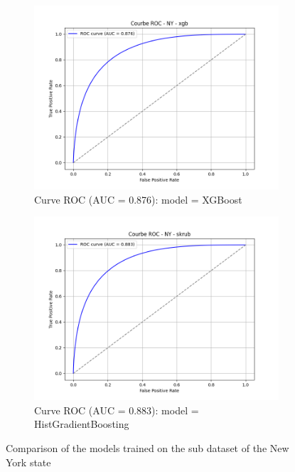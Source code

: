 \begin{figure}[h]
    \begin{subfigure}[b]{0.48\textwidth}
        \includegraphics[width=\textwidth]{Images/curve_roc_folktables/roc_curve_NY_xgb.png}
        \caption{Curve ROC (AUC = 0.876): model = XGBoost}
        \label{fig:NY_xgb}
    \end{subfigure}
    \hfill
    \begin{subfigure}[b]{0.48\textwidth}
        \includegraphics[width=\textwidth]{Images/curve_roc_folktables/roc_curve_NY_skrub.png}
        \caption{Curve ROC (AUC = 0.883): model = HistGradientBoosting}
        \label{fig:NY_skrub}
    \end{subfigure}
    \caption{Comparison of the models trained on the sub dataset of the New York state}
    \label{fig:roc_ny}
\end{figure}